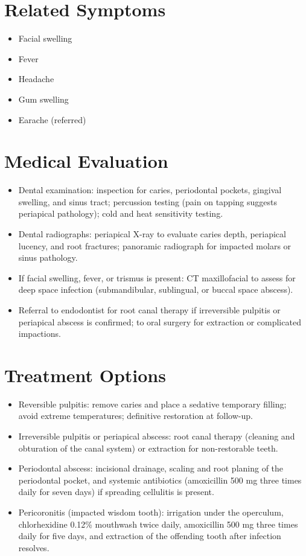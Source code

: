 \section*{Related Symptoms}
\begin{itemize}
  \item Facial swelling
  \item Fever
  \item Headache
  \item Gum swelling
  \item Earache (referred)
\end{itemize}

\section*{Medical Evaluation}
\begin{itemize}
  \item Dental examination: inspection for caries, periodontal pockets, gingival swelling, and sinus tract; percussion testing (pain on tapping suggests periapical pathology); cold and heat sensitivity testing.
  \item Dental radiographs: periapical X-ray to evaluate caries depth, periapical lucency, and root fractures; panoramic radiograph for impacted molars or sinus pathology.
  \item If facial swelling, fever, or trismus is present: CT maxillofacial to assess for deep space infection (submandibular, sublingual, or buccal space abscess).
  \item Referral to endodontist for root canal therapy if irreversible pulpitis or periapical abscess is confirmed; to oral surgery for extraction or complicated impactions.
\end{itemize}

\section*{Treatment Options}
\begin{itemize}
  \item Reversible pulpitis: remove caries and place a sedative temporary filling; avoid extreme temperatures; definitive restoration at follow-up.
  \item Irreversible pulpitis or periapical abscess: root canal therapy (cleaning and obturation of the canal system) or extraction for non-restorable teeth.
  \item Periodontal abscess: incisional drainage, scaling and root planing of the periodontal pocket, and systemic antibiotics (amoxicillin 500 mg three times daily for seven days) if spreading cellulitis is present.
  \item Pericoronitis (impacted wisdom tooth): irrigation under the operculum, chlorhexidine 0.12\% mouthwash twice daily, amoxicillin 500 mg three times daily for five days, and extraction of the offending tooth after infection resolves.
\end{itemize}


